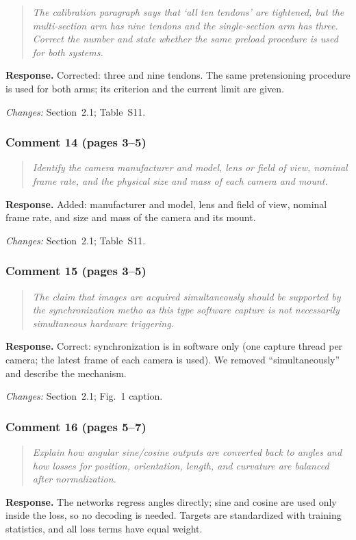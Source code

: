 \documentclass[11pt,a4paper]{article}
\newcommand{\rc}[1]{\begin{quote}\color{black!70}\itshape #1\end{quote}}
\begin{document}
\rc{The calibration paragraph says that `all ten tendons' are tightened, but the multi-section arm has nine tendons and the single-section arm has three. Correct the number and state whether the same preload procedure is used for both systems.}
\textbf{Response.} Corrected: three and nine tendons. The same pretensioning procedure is used for both arms; its criterion and the current limit are given.

\textit{Changes:} Section~2.1; Table~S11.

\subsubsection*{Comment 14 (pages 3--5)}

\rc{Identify the camera manufacturer and model, lens or field of view, nominal frame rate, and the physical size and mass of each camera and mount.}
\textbf{Response.} Added: manufacturer and model, lens and field of view, nominal frame rate, and size and mass of the camera and its mount.

\textit{Changes:} Section~2.1; Table~S11.

\subsubsection*{Comment 15 (pages 3--5)}

\rc{The claim that images are acquired simultaneously should be supported by the synchronization metho as this type software capture is not necessarily simultaneous hardware triggering.}
\textbf{Response.} Correct: synchronization is in software only (one capture thread per camera; the latest frame of each camera is used). We removed ``simultaneously'' and describe the mechanism.

\textit{Changes:} Section~2.1; Fig.~1 caption.

\subsubsection*{Comment 16 (pages 5--7)}

\rc{Explain how angular sine/cosine outputs are converted back to angles and how losses for position, orientation, length, and curvature are balanced after normalization.}
\textbf{Response.} The networks regress angles directly; sine and cosine are used only inside the loss, so no decoding is needed. Targets are standardized with training statistics, and all loss terms have equal weight.
\end{document}
